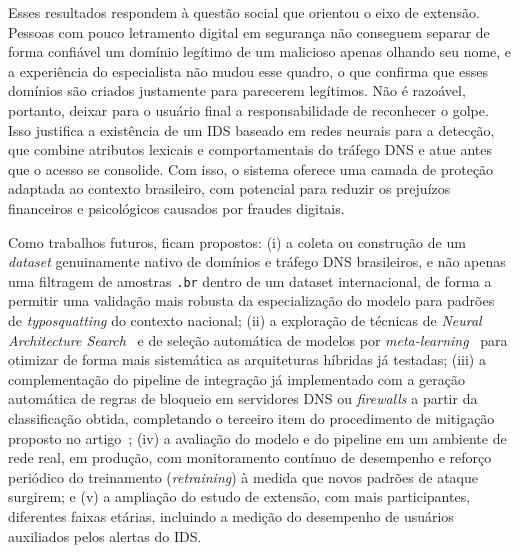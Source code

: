 Esses resultados respondem à questão social que orientou o eixo de extensão. Pessoas com pouco letramento digital em segurança não conseguem separar de forma confiável um domínio legítimo de um malicioso apenas olhando seu nome, e a experiência do especialista não mudou esse quadro, o que confirma que esses domínios são criados justamente para parecerem legítimos. Não é razoável, portanto, deixar para o usuário final a responsabilidade de reconhecer o golpe. Isso justifica a existência de um IDS baseado em redes neurais para a detecção, que combine atributos lexicais e comportamentais do tráfego DNS e atue antes que o acesso se consolide. Com isso, o sistema oferece uma camada de proteção adaptada ao contexto brasileiro, com potencial para reduzir os prejuízos financeiros e psicológicos causados por fraudes digitais.

Como trabalhos futuros, ficam propostos: (i) a coleta ou construção de um \textit{dataset} genuinamente nativo de domínios e tráfego DNS brasileiros, e não apenas uma filtragem de amostras \texttt{.br} dentro de um dataset internacional, de forma a permitir uma validação mais robusta da especialização do modelo para padrões de \textit{typosquatting} do contexto nacional; (ii) a exploração de técnicas de \textit{Neural Architecture Search}~\citep{ren2021,zoph2016} e de seleção automática de modelos por \textit{meta-learning}~\citep{sylligardos2023} para otimizar de forma mais sistemática as arquiteturas híbridas já testadas; (iii) a complementação do pipeline de integração já implementado com a geração automática de regras de bloqueio em servidores DNS ou \textit{firewalls} a partir da classificação obtida, completando o terceiro item do procedimento de mitigação proposto no artigo~\citep{hirata2026dns}; (iv) a avaliação do modelo e do pipeline em um ambiente de rede real, em produção, com monitoramento contínuo de desempenho e reforço periódico do treinamento (\textit{retraining}) à medida que novos padrões de ataque surgirem; e (v) a ampliação do estudo de extensão, com mais participantes, diferentes faixas etárias, incluindo a medição do desempenho de usuários auxiliados pelos alertas do IDS.